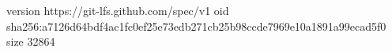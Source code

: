 version https://git-lfs.github.com/spec/v1
oid sha256:a7126d64bdf4ac1fc0ef25e73edb271cb25b98ccde7969e10a1891a99ecad5f0
size 32864
